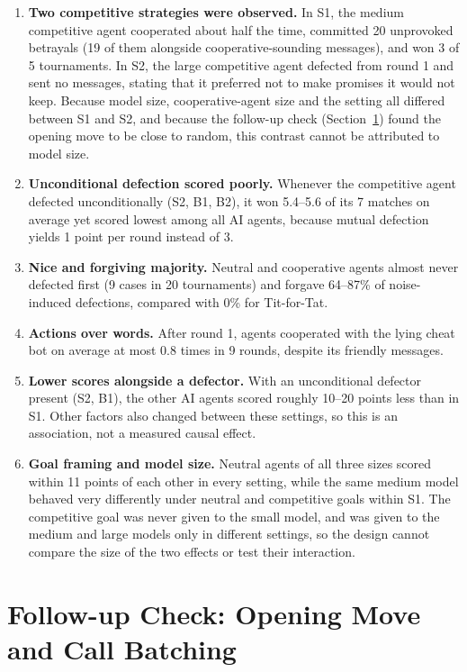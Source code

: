 \documentclass[11pt,a4paper]{article}
\begin{document}
\begin{enumerate}
  \item \textbf{Two competitive strategies were observed.} In S1, the medium competitive agent cooperated about half the time, committed 20 unprovoked betrayals (19 of them alongside cooperative-sounding messages), and won 3 of 5 tournaments. In S2, the large competitive agent defected from round 1 and sent no messages, stating that it preferred not to make promises it would not keep. Because model size, cooperative-agent size and the setting all differed between S1 and S2, and because the follow-up check (Section~\ref{sec:check}) found the opening move to be close to random, this contrast cannot be attributed to model size.
  \item \textbf{Unconditional defection scored poorly.} Whenever the competitive agent defected unconditionally (S2, B1, B2), it won 5.4--5.6 of its 7 matches on average yet scored lowest among all AI agents, because mutual defection yields 1 point per round instead of 3.
  \item \textbf{Nice and forgiving majority.} Neutral and cooperative agents almost never defected first (9 cases in 20 tournaments) and forgave 64--87\% of noise-induced defections, compared with 0\% for Tit-for-Tat.
  \item \textbf{Actions over words.} After round 1, agents cooperated with the lying cheat bot on average at most 0.8 times in 9 rounds, despite its friendly messages.
  \item \textbf{Lower scores alongside a defector.} With an unconditional defector present (S2, B1), the other AI agents scored roughly 10--20 points less than in S1. Other factors also changed between these settings, so this is an association, not a measured causal effect.
  \item \textbf{Goal framing and model size.} Neutral agents of all three sizes scored within 11 points of each other in every setting, while the same medium model behaved very differently under neutral and competitive goals within S1. The competitive goal was never given to the small model, and was given to the medium and large models only in different settings, so the design cannot compare the size of the two effects or test their interaction.
\end{enumerate}

\section{Follow-up Check: Opening Move and Call Batching}
\label{sec:check}
\end{document}
